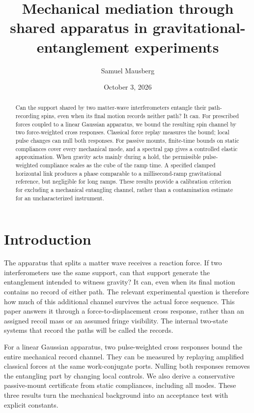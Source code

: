 \documentclass[aps,pra,reprint,amsmath,amssymb,longbibliography,floatfix]{revtex4-2}
\begin{document}
\title{Mechanical mediation through shared apparatus in gravitational-entanglement experiments}
\author{Samuel Mausberg}
\date{October 3, 2026}
\begin{abstract}
Can the support shared by two matter-wave interferometers entangle their path-recording spins, even when its final motion records neither path? It can. For prescribed forces coupled to a linear Gaussian apparatus, we bound the resulting spin channel by two force-weighted cross responses. Classical force replay measures the bound; local pulse changes can null both responses. For passive mounts, finite-time bounds on static compliances cover every mechanical mode, and a spectral gap gives a controlled elastic approximation. When gravity acts mainly during a hold, the permissible pulse-weighted compliance scales as the cube of the ramp time. A specified clamped horizontal link produces a phase comparable to a millisecond-ramp gravitational reference, but negligible for long ramps. These results provide a calibration criterion for excluding a mechanical entangling channel, rather than a contamination estimate for an uncharacterized instrument.
\end{abstract}
\maketitle
\raggedbottom

\section{Introduction}
The apparatus that splits a matter wave receives a reaction force. If two interferometers use the same support, can that support generate the entanglement intended to witness gravity? It can, even when its final motion contains no record of either path. The relevant experimental question is therefore how much of this additional channel survives the actual force sequence. This paper answers it through a force-to-displacement cross response, rather than an assigned recoil mass or an assumed fringe visibility. The internal two-state systems that record the paths will be called the records.

For a linear Gaussian apparatus, two pulse-weighted cross responses bound the entire mechanical record channel. They can be measured by replaying amplified classical forces at the same work-conjugate ports. Nulling both responses removes the entangling part by changing local controls. We also derive a conservative passive-mount certificate from static compliances, including all modes. These three results turn the mechanical background into an acceptance test with explicit constants.
\end{document}
